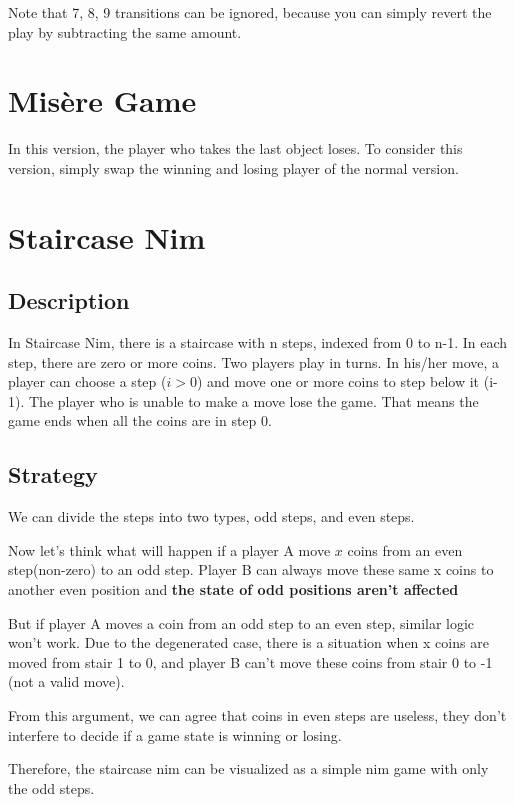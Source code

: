 Note that {7, 8, 9} transitions can be ignored, because you can simply revert the play by subtracting the same amount.

\section{Misère Game}

In this version, the player who takes the last object loses.
To consider this version, simply swap the winning and losing player of the normal version.

\section{Staircase Nim}

\subsection{Description}

In Staircase Nim, there is a staircase with n steps, indexed from 0 to n-1. 
In each step, there are zero or more coins.
Two players play in turns. In his/her move, a player can choose a step ($i > 0$)
and move one or more coins to step below it (i-1).
The player who is unable to make a move lose the game.
That means the game ends when all the coins are in step 0.

\subsection{Strategy}

We can divide the steps into two types, odd steps, and even steps.

Now let's think what will happen if a player A move $x$ coins from an even step(non-zero) to an odd step.
Player B can always move these same x coins to another even position and \textbf{the state of odd positions aren't affected}

But if player A moves a coin from an odd step to an even step, similar logic won't work.
Due to the degenerated case, there is a situation when x coins are moved from stair 1 to 0,
and player B can't move these coins from stair 0 to -1 (not a valid move).

From this argument, we can agree that coins in even steps are useless,
they don't interfere to decide if a game state is winning or losing.

Therefore, the staircase nim can be visualized as a simple nim game with only the odd steps.

